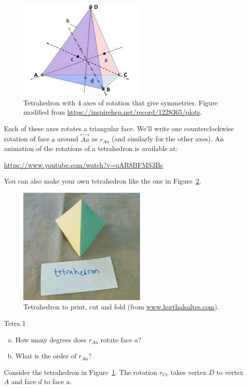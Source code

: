 \begin{figure}[ht]
\begin{center}
\includegraphics[width=2.5in]{images/TetrahedronC.png}
\caption{\label{fig:TetRot}Tetrahedron with 4 axes of rotation that give symmetries. Figure modified  from \url{https://inspirehep.net/record/1228365/plots}.}
\end{center}
\end{figure}


Each of these axes rotates a triangular face. We'll write one counterclockwise rotation of face $a$ around $\overset{\leftrightarrow}{Aa}$ as $r_{Aa}$ (and similarly for the other axes).
An animation of the rotations of a tetrahedron is available at:

\url{https://www.youtube.com/watch?v=qAR8BFMS3Bc}

You can also make your own tetrahedron like the one in Figure~\ref{fig:TetraFold}.

\begin{figure}[ht]
\begin{center}
\includegraphics[width=2.5in]{images/TetrahedronFold.png}
\caption{\label{fig:TetraFold}Tetrahedron to print, cut and fold 
(from \url{www.korthalsaltes.com}).}
 
\end{center}
\end{figure}

\begin{exercise}{Tetra 1}
\begin{enumerate}[(a)]
\item How many degrees does $ r_{Aa}$ rotate face $a$?
\item What is the order of $r_{Aa}$?
\end{enumerate}

\end{exercise}
Consider the tetrahedron in Figure~\ref{fig:TetRot}.  The rotation $r_{Cc}$ takes vertex $D$ to vertex $A$ and face $d$ to face $a$.  

